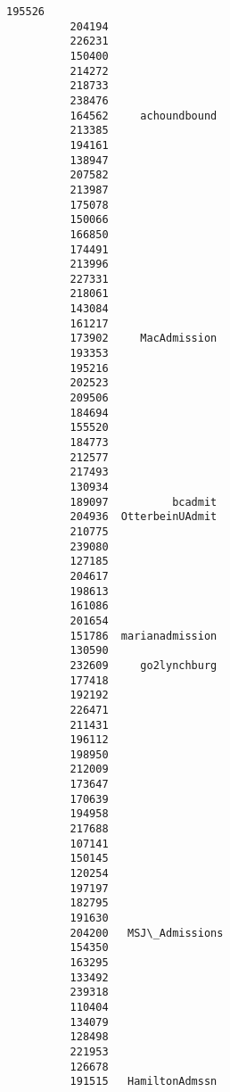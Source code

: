 \documentclass[11pt]{article}
\begin{document}
\begin{Verbatim}[commandchars=\\\{\}]
          195526                   
          204194                   
          226231                   
          150400                   
          214272                   
          218733                   
          238476                   
          164562     achoundbound  
          213385                   
          194161                   
          138947                   
          207582                   
          213987                   
          175078                   
          150066                   
          166850                   
          174491                   
          213996                   
          227331                   
          218061                   
          143084                   
          161217                   
          173902     MacAdmission  
          193353                   
          195216                   
          202523                   
          209506                   
          184694                   
          155520                   
          184773                   
          212577                   
          217493                   
          130934                   
          189097          bcadmit  
          204936  OtterbeinUAdmit  
          210775                   
          239080                   
          127185                   
          204617                   
          198613                   
          161086                   
          201654                   
          151786  marianadmission  
          130590                   
          232609     go2lynchburg  
          177418                   
          192192                   
          226471                   
          211431                   
          196112                   
          198950                   
          212009                   
          173647                   
          170639                   
          194958                   
          217688                   
          107141                   
          150145                   
          120254                   
          197197                   
          182795                   
          191630                   
          204200   MSJ\_Admissions  
          154350                   
          163295                   
          133492                   
          239318                   
          110404                   
          134079                   
          128498                   
          221953                   
          126678                   
          191515   HamiltonAdmssn  

\end{Verbatim}
\end{document}
